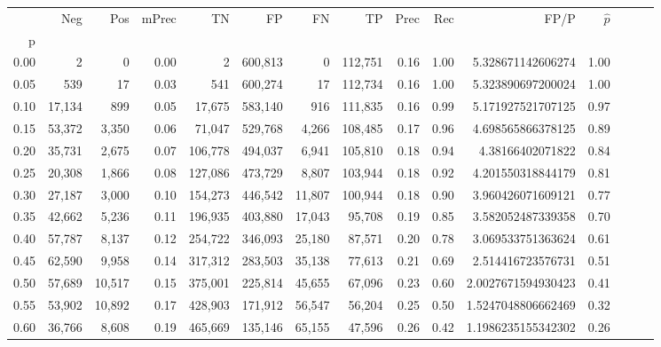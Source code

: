 \begin{tabular}{rrrrrrrrrrrrrrr}
\toprule
{} &     Neg &     Pos & mPrec &       TN &       FP &       FN &       TP &  Prec &   Rec &                  FP/P & $\hat{p}$ \\
p    &         &         &       &          &          &          &          &       &       &                       &           \\
\midrule
0.00 &       2 &       0 &  0.00 &        2 &  600,813 &        0 &  112,751 &  0.16 &  1.00 &     5.328671142606274 &      1.00 \\
0.05 &     539 &      17 &  0.03 &      541 &  600,274 &       17 &  112,734 &  0.16 &  1.00 &     5.323890697200024 &      1.00 \\
0.10 &  17,134 &     899 &  0.05 &   17,675 &  583,140 &      916 &  111,835 &  0.16 &  0.99 &     5.171927521707125 &      0.97 \\
0.15 &  53,372 &   3,350 &  0.06 &   71,047 &  529,768 &    4,266 &  108,485 &  0.17 &  0.96 &     4.698565866378125 &      0.89 \\
0.20 &  35,731 &   2,675 &  0.07 &  106,778 &  494,037 &    6,941 &  105,810 &  0.18 &  0.94 &      4.38166402071822 &      0.84 \\
0.25 &  20,308 &   1,866 &  0.08 &  127,086 &  473,729 &    8,807 &  103,944 &  0.18 &  0.92 &     4.201550318844179 &      0.81 \\
0.30 &  27,187 &   3,000 &  0.10 &  154,273 &  446,542 &   11,807 &  100,944 &  0.18 &  0.90 &     3.960426071609121 &      0.77 \\
0.35 &  42,662 &   5,236 &  0.11 &  196,935 &  403,880 &   17,043 &   95,708 &  0.19 &  0.85 &     3.582052487339358 &      0.70 \\
0.40 &  57,787 &   8,137 &  0.12 &  254,722 &  346,093 &   25,180 &   87,571 &  0.20 &  0.78 &     3.069533751363624 &      0.61 \\
0.45 &  62,590 &   9,958 &  0.14 &  317,312 &  283,503 &   35,138 &   77,613 &  0.21 &  0.69 &     2.514416723576731 &      0.51 \\
0.50 &  57,689 &  10,517 &  0.15 &  375,001 &  225,814 &   45,655 &   67,096 &  0.23 &  0.60 &    2.0027671594930423 &      0.41 \\
0.55 &  53,902 &  10,892 &  0.17 &  428,903 &  171,912 &   56,547 &   56,204 &  0.25 &  0.50 &    1.5247048806662469 &      0.32 \\
0.60 &  36,766 &   8,608 &  0.19 &  465,669 &  135,146 &   65,155 &   47,596 &  0.26 &  0.42 &    1.1986235155342302 &      0.26 \\

\end{tabular}
